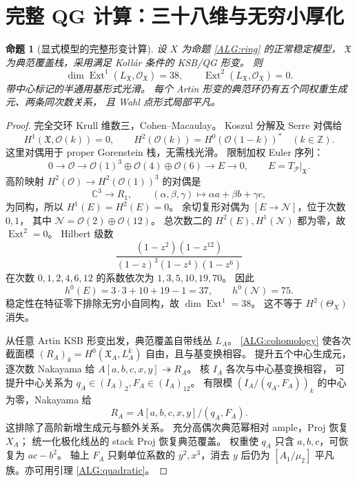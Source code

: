 \documentclass[UTF8,fontset=fandol,zihao=-4,oneside,openany]{ctexbook}
\theoremstyle{cjkplain}
\newtheorem{proposition}[theorem]{命题}
\numberwithin{equation}{chapter}
\begin{document}
\section{完整 QG 计算：三十八维与无穷小厚化}

\begin{proposition}[显式模型的完整形变计算]
\label{ALG:QG}
设 $X$ 为命题 \ref{ALG:ring} 的正常稳定模型，
$\mathfrak X$ 为典范覆盖栈，采用满足 Kollár 条件的 KSB/QG 形变。
则
\begin{equation}
\dim\operatorname{Ext}^1(L_{\mathfrak X},\mathcal O_{\mathfrak X})=38,
\qquad \operatorname{Ext}^2(L_{\mathfrak X},\mathcal O_{\mathfrak X})=0.
\label{ALG:ext38}
\end{equation}
带中心标记的半通用基形式光滑。
每个 Artin 形变的典范环仍有五个同权重生成元、两条同次数关系，
且 Wahl 点形式局部平凡。
\end{proposition}
\begin{proof}
完全交环 Krull 维数三，Cohen--Macaulay。
Koszul 分解及 Serre 对偶给
\begin{equation}
H^1(\mathfrak X,\mathcal O(k))=0,\qquad
H^2(\mathcal O(k))=H^0(\mathcal O(1-k))^*
\quad(k\in\mathbb Z).
\label{ALG:cohomology}
\end{equation}
这里对偶用于 proper Gorenstein 栈，无需栈光滑。
限制加权 Euler 序列：
\[
0\to\mathcal O\to
\mathcal O(1)^3\oplus\mathcal O(4)\oplus\mathcal O(6)
\to E\to0,\qquad E=T_{\mathcal P}|_{\mathfrak X}.
\]
高阶映射 $H^2(\mathcal O)\to H^2(\mathcal O(1))^3$ 的对偶是
\[
\mathbb C^3\to R_1,\qquad
(\alpha,\beta,\gamma)\mapsto\alpha a+\beta b+\gamma c,
\]
为同构，所以 $H^1(E)=H^2(E)=0$。
余切复形对偶为 $[E\to\mathcal N]$，位于次数 $0,1$，
其中 $\mathcal N=\mathcal O(2)\oplus\mathcal O(12)$。
总次数二的 $H^2(E),H^1(\mathcal N)$ 都为零，故 $\operatorname{Ext}^2=0$。
Hilbert 级数
\[
\frac{(1-z^2)(1-z^{12})}{(1-z)^3(1-z^4)(1-z^6)}
\]
在次数 $0,1,2,4,6,12$ 的系数依次为 $1,3,5,10,19,70$。
因此
\[
h^0(E)=3\cdot3+10+19-1=37,\qquad h^0(\mathcal N)=75.
\]
稳定性在特征零下排除无穷小自同构，故 $\dim\operatorname{Ext}^1=38$。
这不等于 $H^2(\Theta_X)$ 消失。

从任意 Artin KSB 形变出发，典范覆盖自带线丛 $L_A$。
\eqref{ALG:cohomology} 使各次截面模
$(R_A)_k=H^0(\mathfrak X_A,L_A^k)$ 自由，且与基变换相容。
提升五个中心生成元，逐次数 Nakayama 给
$A[a,b,c,x,y]\twoheadrightarrow R_A$。
核 $I_A$ 各次与中心基变换相容，
可提升中心关系为 $q_A\in(I_A)_2,F_A\in(I_A)_{12}$。
有限模 $(I_A/(q_A,F_A))_k$ 的中心为零，Nakayama 给
\begin{equation}
R_A=A[a,b,c,x,y]/(q_A,F_A).
\label{ALG:allartinring}
\end{equation}
这排除了高阶新增生成元与额外关系。
充分高偶次典范幂相对 ample，Proj 恢复 $X_A$；
统一化极化线丛的 stack Proj 恢复典范覆盖。
权重使 $q_A$ 只含 $a,b,c$，可恢复为 $ac-b^2$。
轴上 $F_A$ 只剩单位系数的 $y^2,x^3$，消去 $y$ 后仍为
$[A_1/\mu_2]$ 平凡族。亦可用引理 \ref{ALG:quadratic}。
\end{proof}
\end{document}
